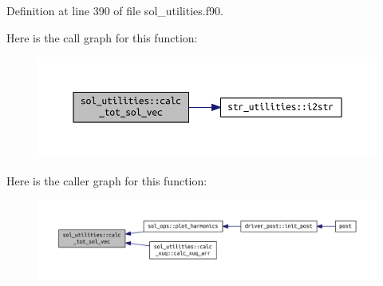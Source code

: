 Definition at line 390 of file sol\+\_\+utilities.\+f90.

Here is the call graph for this function\+:
\nopagebreak
\begin{figure}[H]
\begin{center}
\leavevmode
\includegraphics[width=350pt]{namespacesol__utilities_ad23f2a5293e2d7caf78be4d8fdf5a06d_cgraph}
\end{center}
\end{figure}
Here is the caller graph for this function\+:
\nopagebreak
\begin{figure}[H]
\begin{center}
\leavevmode
\includegraphics[width=350pt]{namespacesol__utilities_ad23f2a5293e2d7caf78be4d8fdf5a06d_icgraph}
\end{center}
\end{figure}
\mbox{\label{namespacesol__utilities_a687c87db78ca79ec617a4cfb7ed62f9e}} 
